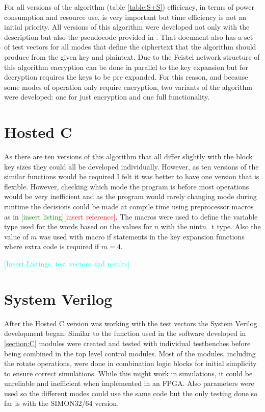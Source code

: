 \documentclass[12pt,twoside,a4paper]{report}
\begin{document}
    For all versions of the algorithm (table \ref{table:S+S}) efficiency, in terms of power consumption and resource use, is very important but time efficiency is not an initial priority. All versions of this algorithm were developed not only with the description but also the pseudocode provided in \cite{Beaulieu2015}. That document also has a set of test vectors for all modes that define the ciphertext that the algorithm should produce from the given key and plaintext. Due to the Feistel network structure of this algorithm encryption can be done in parallel to the key expansion but for decryption requires the keys to be pre expanded. For this reason, and because some modes of operation only require encryption, two variants of the algorithm were developed: one for just encryption and one full functionality.
    
    \section{Hosted C}
    \label{section:C}
    As there are ten versions of this algorithm that all differ slightly with the block key sizes they could all be developed individually. However, as ten versions of the similar functions would be required I felt it was better to have one version that is flexible. However, checking which mode the program is before most operations would be very inefficient and as the program would rarely changing mode during runtime the decisions could be made at compile time using preprocessor macros as in \textcolor{green}{[insert listing]}\textcolor{red}{[insert reference]}. The macros were used to define the variable type used for the words based on the values for $n$ with the uint$n$\_t type. Also the value of $m$ was used with macro if statements in the key expansion functions where extra code is required if $m = 4$.
    
    \textcolor{cyan}{[Insert Listings, test vectors and results]}
    
    \section{System Verilog}
    After the Hosted C version was working with the test vectors the System Verilog development began. Similar to the function used in the software developed in \autoref{section:C} modules were created and tested with individual testbenches before being combined in the top level control modules. Most of the modules, including the rotate operations, were done in combination logic blocks for initial simplicity to ensure correct simulations. While this might work in simulations, it could be unreliable and inefficient when implemented in an FPGA. Also parameters were used so the different modes could use the same code but the only testing done so far is with the SIMON32/64 version.
    
\end{document}
